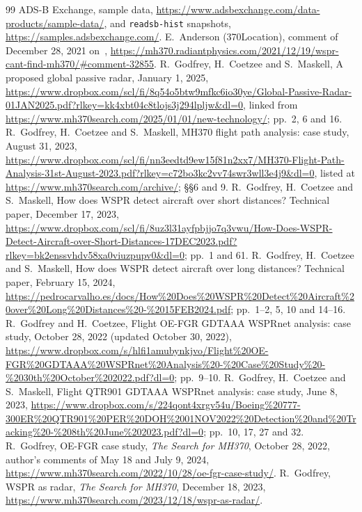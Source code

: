 \documentclass[11pt]{article}
\begin{document}
\begin{thebibliography}{99}
 ADS-B Exchange, sample data, \url{https://www.adsbexchange.com/data-products/sample-data/}, and \texttt{readsb-hist} snapshots, \url{https://samples.adsbexchange.com/}.
 E.~Anderson (370Location), comment of December 28, 2021 on~\cite{iannello2021}, \url{https://mh370.radiantphysics.com/2021/12/19/wspr-cant-find-mh370/#comment-32855}.
 R.~Godfrey, H.~Coetzee and S.~Maskell, A proposed global passive radar, January 1, 2025, \url{https://www.dropbox.com/scl/fi/8q54o5btw9mfkc6io30ye/Global-Passive-Radar-01JAN2025.pdf?rlkey=kk4xbt04c8tlojs3j294lpljw&dl=0}, linked from \url{https://www.mh370search.com/2025/01/01/new-technology/}; pp.~2, 6 and 16.
 R.~Godfrey, H.~Coetzee and S.~Maskell, MH370 flight path analysis: case study, August 31, 2023, \url{https://www.dropbox.com/scl/fi/nn3eedtd9ew15f81n2xx7/MH370-Flight-Path-Analysis-31st-August-2023.pdf?rlkey=c72bo3kc2vv74swr3wll3e4j9&dl=0}, listed at \url{https://www.mh370search.com/archive/}; \S\S6 and 9.
 R.~Godfrey, H.~Coetzee and S.~Maskell, How does WSPR detect aircraft over short distances? Technical paper, December 17, 2023, \url{https://www.dropbox.com/scl/fi/8uz3l31ayfpbjjo7q3vwu/How-Does-WSPR-Detect-Aircraft-over-Short-Distances-17DEC2023.pdf?rlkey=bk2enssvhdv58xa0viuzpupv0&dl=0}; pp.~1 and 61.
 R.~Godfrey, H.~Coetzee and S.~Maskell, How does WSPR detect aircraft over long distances? Technical paper, February 15, 2024, \url{https://pedrocarvalho.es/docs/How%20Does%20WSPR%20Detect%20Aircraft%20over%20Long%20Distances%20-%2015FEB2024.pdf}; pp.~1--2, 5, 10 and 14--16.
 R.~Godfrey and H.~Coetzee, Flight OE-FGR GDTAAA WSPRnet analysis: case study, October 28, 2022 (updated October 30, 2022), \url{https://www.dropbox.com/s/hlfi1amubynkjvo/Flight%20OE-FGR%20GDTAAA%20WSPRnet%20Analysis%20-%20Case%20Study%20-%2030th%20October%202022.pdf?dl=0}; pp.~9--10.
 R.~Godfrey, H.~Coetzee and S.~Maskell, Flight QTR901 GDTAAA WSPRnet analysis: case study, June 8, 2023, \url{https://www.dropbox.com/s/224qont4xrgv54u/Boeing%20777-300ER%20QTR901%20PER%20DOH%2001NOV2022%20Detection%20and%20Tracking%20-%208th%20June%202023.pdf?dl=0}; pp.~10, 17, 27 and 32.
 R.~Godfrey, OE-FGR case study, \emph{The Search for MH370}, October 28, 2022, author's comments of May 18 and July 9, 2024, \url{https://www.mh370search.com/2022/10/28/oe-fgr-case-study/}.
 R.~Godfrey, WSPR as radar, \emph{The Search for MH370}, December 18, 2023, \url{https://www.mh370search.com/2023/12/18/wspr-as-radar/}.

\end{thebibliography}
\end{document}
